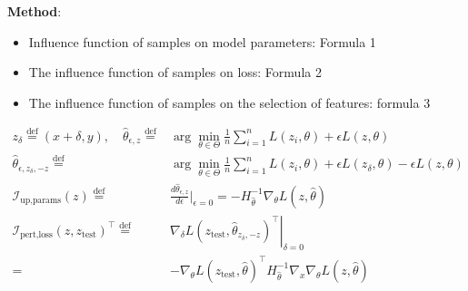 \documentclass[11pt]{beamer}
\begin{document}
\begin{frame}
    \textbf{Method}:
    \begin{itemize}
        \item Influence function of samples on model parameters: Formula 1
        \item The influence function of samples on loss: Formula 2
        \item The influence function of samples on the selection of features: formula 3
    \end{itemize}
        \begin{align*}
            z_\delta \stackrel{\text{def}}{=} (x+\delta, y), \quad
            \hat{\theta}_{\epsilon, z} \stackrel{\text{def}}{=}& \arg\min_{\theta\in\Theta} \frac{1}{n} \sum_{i=1}^n L(z_i, \theta) + \epsilon L(z, \theta)                                               \\
            \hat{\theta}_{\epsilon, z_\delta,-z} \stackrel{\text{def}}{=}& \arg\min_{\theta\in\Theta} \frac{1}{n} \sum_{i=1}^n L(z_i, \theta) + \epsilon L(z_\delta, \theta) - \epsilon L(z, \theta)      \\
            \mathcal{I}_{\text{up,params}}(z) \stackrel{\text{def}}{=} & \frac{d\hat{\theta}_{\epsilon, z}}{d\epsilon}\left.\right|_{\epsilon=0} = -H_{\hat{\theta}}^{-1} \nabla_\theta L(z, \hat{\theta}) \\
            \mathcal{I}_{\text{pert,loss}}(z, z_{\text{test}})^{\top} \stackrel{\text{def}}{=}& \left.\nabla_\delta L(z_{\text{test}}, \hat{\theta}_{z_\delta,-z})^{\top}\right|_{\delta=0} \\ =& -\nabla_\theta L(z_{\text{test}}, \hat{\theta})^{\top} H_{\hat{\theta}}^{-1} \nabla_x \nabla_\theta L(z, \hat{\theta})
        \end{align*}

\end{frame}
\end{document}
